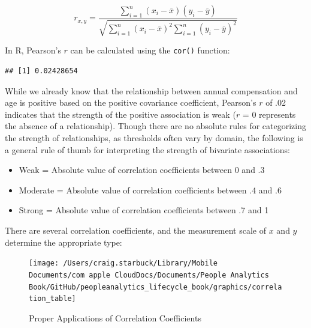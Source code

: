 \documentclass[
]{book}
\newenvironment{Shaded}{\begin{snugshade}}{\end{snugshade}}
\newcommand{\AttributeTok}[1]{\textcolor[rgb]{0.77,0.63,0.00}{#1}}
\newcommand{\CommentTok}[1]{\textcolor[rgb]{0.56,0.35,0.01}{\textit{#1}}}
\newcommand{\FunctionTok}[1]{\textcolor[rgb]{0.00,0.00,0.00}{#1}}
\newcommand{\NormalTok}[1]{#1}
\newcommand{\SpecialCharTok}[1]{\textcolor[rgb]{0.00,0.00,0.00}{#1}}
\newcommand{\StringTok}[1]{\textcolor[rgb]{0.31,0.60,0.02}{#1}}
\providecommand{\tightlist}{%
  \setlength{\itemsep}{0pt}\setlength{\parskip}{0pt}}
\begin{document}
\[ r_{x,y} = \frac{\displaystyle\sum_{i=1}^{n} (x_{i}-\bar{x})(y_{i}-\bar{y})}{\sqrt{\displaystyle\sum_{i=1}^{n} (x_{i}-\bar{x})^2 \displaystyle\sum_{i=1}^{n} (y_{i}-\bar{y})^2}} \]

In R, Pearson's \(r\) can be calculated using the \texttt{cor()} function:

\begin{Shaded}
\end{Shaded}

\begin{verbatim}
## [1] 0.02428654
\end{verbatim}

While we already know that the relationship between annual compensation and age is positive based on the positive covariance coefficient, Pearson's \(r\) of .02 indicates that the strength of the positive association is weak (\(r\) = 0 represents the absence of a relationship). Though there are no absolute rules for categorizing the strength of relationships, as thresholds often vary by domain, the following is a general rule of thumb for interpreting the strength of bivariate associations:

\begin{itemize}
\tightlist
\item
  Weak = Absolute value of correlation coefficients between 0 and .3
\item
  Moderate = Absolute value of correlation coefficients between .4 and .6
\item
  Strong = Absolute value of correlation coefficients between .7 and 1
\end{itemize}

There are several correlation coefficients, and the measurement scale of \(x\) and \(y\) determine the appropriate type:

\begin{figure}

{\centering \texttt{[image: /Users/craig.starbuck/Library/Mobile Documents/com~apple~CloudDocs/Documents/People Analytics Book/GitHub/peopleanalytics\_lifecycle\_book/graphics/correlation\_table]} 

}

\caption{Proper Applications of Correlation Coefficients}\label{fig:corr-table}
\end{figure}
\end{document}
